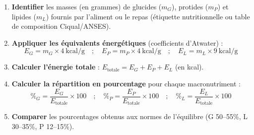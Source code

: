 \documentclass[11pt]{article}
\begin{document}
\begin{methode}
\begin{enumerate}
\item \textbf{Identifier} les masses (en grammes) de glucides ($m_G$), protides ($m_P$) et lipides ($m_L$) fournis par l'aliment ou le repas (étiquette nutritionnelle ou table de composition Ciqual/ANSES).
\item \textbf{Appliquer les équivalents énergétiques} (coefficients d'Atwater) :
\[ E_G = m_G \times 4\ \mathrm{kcal/g} \quad ; \quad E_P = m_P \times 4\ \mathrm{kcal/g} \quad ; \quad E_L = m_L \times 9\ \mathrm{kcal/g} \]
\item \textbf{Calculer l'énergie totale} : $E_{\text{totale}} = E_G + E_P + E_L$ (en kcal).
\item \textbf{Calculer la répartition en pourcentage} pour chaque macronutriment :
\[ \%_G = \frac{E_G}{E_{\text{totale}}} \times 100 \quad ; \quad \%_P = \frac{E_P}{E_{\text{totale}}} \times 100 \quad ; \quad \%_L = \frac{E_L}{E_{\text{totale}}} \times 100 \]
\item \textbf{Comparer} les pourcentages obtenus aux normes de l'équilibre (G 50--55\%, L 30--35\%, P 12--15\%).
\end{enumerate}
\end{methode}
\end{document}
